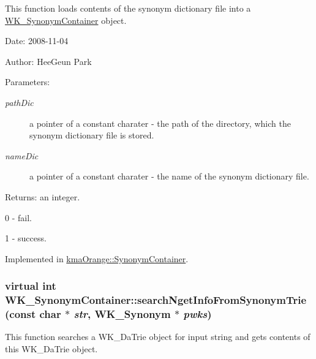 This function loads contents of the synonym dictionary file into a \hyperlink{classWK__SynonymContainer}{WK\_\-SynonymContainer} object. 

\begin{Desc}
\item[Date:]2008-11-04 \end{Desc}
\begin{Desc}
\item[Author:]HeeGeun Park \end{Desc}
\begin{Desc}
\item[Parameters:]
\begin{description}
\item[{\em pathDic}]a pointer of a constant charater - the path of the directory, which the synonym dictionary file is stored. \item[{\em nameDic}]a pointer of a constant charater - the name of the synonym dictionary file. \end{description}
\end{Desc}
\begin{Desc}
\item[Returns:]an integer.\par
 0 - fail.\par
 1 - success. \end{Desc}


Implemented in \hyperlink{classkmaOrange_1_1SynonymContainer_8459ec6b5a2d9c1b5313db22be6b65e4}{kmaOrange::SynonymContainer}.\hypertarget{classWK__SynonymContainer_cc44acd798ac38cb00ed4f6caeb6f2fe}{
\subsubsection[{searchNgetInfoFromSynonymTrie}]{\setlength{\rightskip}{0pt plus 5cm}virtual int WK\_\-SynonymContainer::searchNgetInfoFromSynonymTrie (const char $\ast$ {\em str}, \/  {\bf WK\_\-Synonym} $\ast$ {\em pwks})}}
\label{classWK__SynonymContainer_cc44acd798ac38cb00ed4f6caeb6f2fe}


This function searches a WK\_\-DaTrie object for input string and gets contents of this WK\_\-DaTrie object. 

